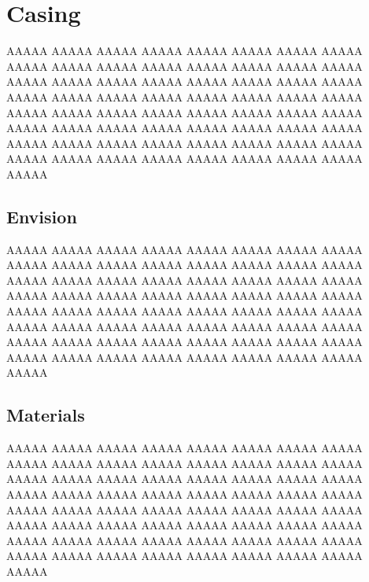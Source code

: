 \setchapterpreamble[u]{\margintoc}

\setcounter{chapter}{9}

\chapter{Casing}

AAAAA AAAAA AAAAA AAAAA AAAAA AAAAA AAAAA AAAAA AAAAA AAAAA AAAAA AAAAA AAAAA AAAAA AAAAA AAAAA AAAAA AAAAA AAAAA AAAAA AAAAA AAAAA AAAAA AAAAA AAAAA AAAAA AAAAA AAAAA AAAAA AAAAA AAAAA AAAAA AAAAA AAAAA AAAAA AAAAA AAAAA AAAAA AAAAA AAAAA AAAAA AAAAA AAAAA AAAAA AAAAA AAAAA AAAAA AAAAA AAAAA AAAAA AAAAA AAAAA AAAAA AAAAA AAAAA AAAAA AAAAA AAAAA AAAAA AAAAA AAAAA AAAAA AAAAA AAAAA AAAAA


\section{Envision}

AAAAA AAAAA AAAAA AAAAA AAAAA AAAAA AAAAA AAAAA AAAAA AAAAA AAAAA AAAAA AAAAA AAAAA AAAAA AAAAA AAAAA AAAAA AAAAA AAAAA AAAAA AAAAA AAAAA AAAAA AAAAA AAAAA AAAAA AAAAA AAAAA AAAAA AAAAA AAAAA AAAAA AAAAA AAAAA AAAAA AAAAA AAAAA AAAAA AAAAA AAAAA AAAAA AAAAA AAAAA AAAAA AAAAA AAAAA AAAAA AAAAA AAAAA AAAAA AAAAA AAAAA AAAAA AAAAA AAAAA AAAAA AAAAA AAAAA AAAAA AAAAA AAAAA AAAAA AAAAA AAAAA

\section{Materials}

AAAAA AAAAA AAAAA AAAAA AAAAA AAAAA AAAAA AAAAA AAAAA AAAAA AAAAA AAAAA AAAAA AAAAA AAAAA AAAAA AAAAA AAAAA AAAAA AAAAA AAAAA AAAAA AAAAA AAAAA AAAAA AAAAA AAAAA AAAAA AAAAA AAAAA AAAAA AAAAA AAAAA AAAAA AAAAA AAAAA AAAAA AAAAA AAAAA AAAAA AAAAA AAAAA AAAAA AAAAA AAAAA AAAAA AAAAA AAAAA AAAAA AAAAA AAAAA AAAAA AAAAA AAAAA AAAAA AAAAA AAAAA AAAAA AAAAA AAAAA AAAAA AAAAA AAAAA AAAAA AAAAA

